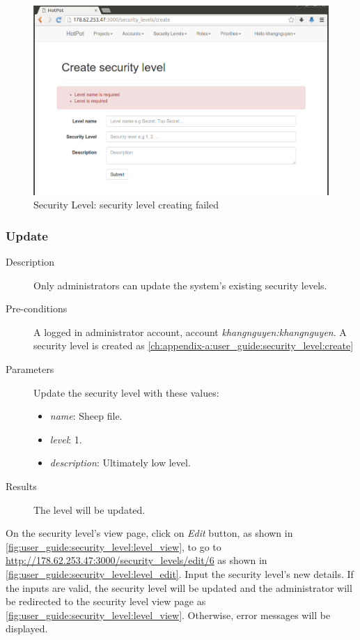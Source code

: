 \begin{figure}[bth]
\myfloatalign
\includegraphics[width=1.0\linewidth]{gfx/chapter_5/security_level/level_create_failed}
\caption[Security Level: security level create]{Security Level: security level creating failed}
\label{fig:user_guide:security_level:level_create_failed}
\end{figure}

\clearpage

\subsubsection{Update}
\label{ch:appendix-a:user_guide:security_level:update}

\begin{description}
\item[Description] Only administrators can update the system's existing security levels.
\item[Pre-conditions] A logged in administrator account, \eg account \emph{khangnguyen:khangnguyen}.
A security level is created as \autoref{ch:appendix-a:user_guide:security_level:create}
\item[Parameters] Update the security level with these values:
\begin{itemize}
\item \emph{name}: Sheep file.
\item \emph{level}: 1.
\item \emph{description}: Ultimately low level.
\end{itemize}
\item[Results] The level will be updated.
\end{description}

On the security level's view page, click on \emph{Edit} button, as shown in \autoref{fig:user_guide:security_level:level_view}, 
to go to \href{http://178.62.253.47:3000/security\_levels/edit/6}{http://178.62.253.47:3000/security\_levels/edit/6} as shown in \autoref{fig:user_guide:security_level:level_edit}.
Input the security level's new details.
If the inputs are valid, the security level will be updated and the administrator will be redirected to the security level view page as \autoref{fig:user_guide:security_level:level_view}.
Otherwise, error messages will be displayed.

